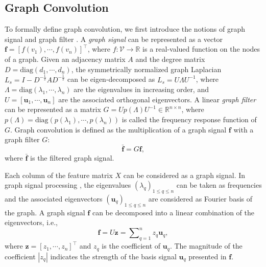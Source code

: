 \documentclass{article}
\begin{document}
\subsection{Graph Convolution}
To formally define graph convolution, we first introduce the notions of graph signal and graph filter \cite{shuman2013emerging}.
A \emph{graph signal} can be represented as a vector $\bm f=[f(v_1),\cdots,f(v_n)]^\top$, where $f: \mathcal{V} \to \mathbb{R}$ is a real-valued function on the nodes of a graph.
Given an adjacency matrix $A$ and the degree matrix $D=\text{diag}(d_1, \cdots, d_n)$, the symmetrically normalized graph Laplacian $L_{s}=I-D^{-\frac12}AD^{-\frac12}$ can be eigen-decomposed as $L_s=U\Lambda U^{-1}$, where $\Lambda=\text{diag}(\lambda_1,\cdots,\lambda_n)$ are the eigenvalues in increasing order, and $U=[\bm u_1,\cdots,\bm u_n]$ are the associated orthogonal eigenvectors. A linear \emph{graph filter} can be represented as a matrix $G=U p(\Lambda)U^{-1}\in \mathbb{R}^{n\times n}$, where $p(\Lambda)=\text{diag}(p(\lambda_1),\cdots,p(\lambda_n))$ is called the frequency response function of $G$.
Graph convolution is defined as the multiplication of a graph signal $\bm f$ with a graph filter $G$:
\begin{equation}\label{conv}
  \bar{\bm f}=G \bm f,
\end{equation}
where $\bar{\bm f}$ is the filtered graph signal.



Each column of the feature matrix $X$ can be considered as a graph signal. In graph signal processing \cite{shuman2013emerging}, the eigenvalues $(\lambda_q)_{1\le q \le n}$ can be taken as frequencies and the associated eigenvectors $(\bm u_q)_{1\le q \le n}$ are considered as Fourier basis of the graph. A graph signal $\bm f$ can be decomposed into a linear combination of the eigenvectors, i.e.,
\begin{equation}\label{eq:signal-decomp}
    \bm f=U \bm z =\sum\nolimits_{q=1}^n{z_q \bm u_q},
\end{equation}
where $\bm z = [z_1,\cdots, z_n]^\top$ and $z_q$ is the coefficient of $\bm u_q$. The magnitude of the coefficient $|z_q|$ indicates the strength of the basis signal $\bm u_q$ presented in $\bm f$.
\end{document}
